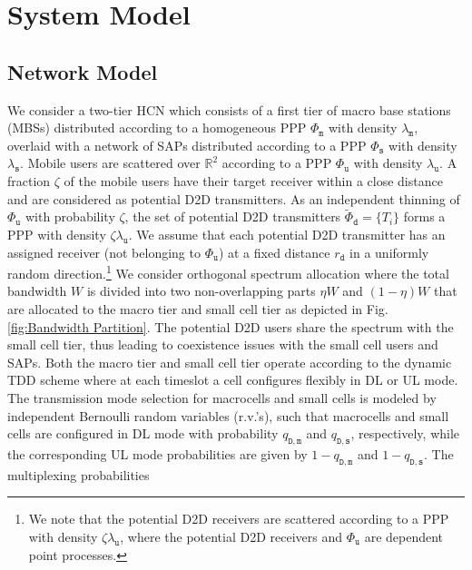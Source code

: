 \documentclass[twocolumn,english]{IEEEtran}
\theoremstyle{plain}
\theoremstyle{definition}
\begin{document}
\section{System Model}


\subsection{Network Model}

We consider a two-tier HCN which consists of a first tier of macro
base stations (MBSs) distributed according to a homogeneous PPP $\Phi_{\mathtt{m}}$
with density $\lambda_{\mathtt{m}}$, overlaid with a network of SAPs
distributed according to a PPP $\Phi_{\mathtt{s}}$ with density $\lambda_{\mathtt{s}}$.
Mobile users are scattered over $\mathbb{R}^{2}$ according to a PPP
$\Phi_{\mathtt{u}}$ with density $\lambda_{\mathtt{u}}$. A fraction
$\zeta$ of the mobile users have their target receiver within a close
distance and are considered as potential D2D transmitters. As an independent
thinning of $\Phi_{\mathtt{u}}$ with probability $\zeta$, the set
of potential D2D transmitters $\tilde{\Phi}_{\mathtt{d}}=\{T_{i}\}$
forms a PPP with density $\zeta\lambda_{\mathtt{u}}$. We assume that
each potential D2D transmitter has an assigned receiver (not belonging
to $\Phi_{\mathtt{u}}$) at a fixed distance $r_{\mathtt{d}}$ in
a uniformly random direction.\footnote{We note that the potential D2D receivers are scattered according to
a PPP with density $\zeta\lambda_{\mathtt{u}}$, where the potential
D2D receivers and $\Phi_{\mathtt{u}}$ are dependent point processes.} We consider orthogonal spectrum allocation where the total bandwidth
$W$ is divided into two non-overlapping parts $\eta W$ and $\left(1-\eta\right)W$
that are allocated to the macro tier and small cell tier as depicted
in Fig. \ref{fig:Bandwidth Partition}. The potential D2D users share
the spectrum with the small cell tier, thus leading to coexistence
issues with the small cell users and SAPs. Both the macro tier and
small cell tier operate according to the dynamic TDD scheme where
at each timeslot a cell configures flexibly in DL or UL mode. The
transmission mode selection for macrocells and small cells is modeled
by independent Bernoulli random variables (r.v.'s), such that macrocells
and small cells are configured in DL mode with probability $q_{\mathtt{D},\mathtt{m}}$
and $q_{\mathtt{D},\mathtt{s}}$, respectively, while the corresponding
UL mode probabilities are given by $1-q_{\mathtt{D},\mathtt{m}}$
and $1-q_{\mathtt{D},\mathtt{s}}$. The multiplexing probabilities
\end{document}
